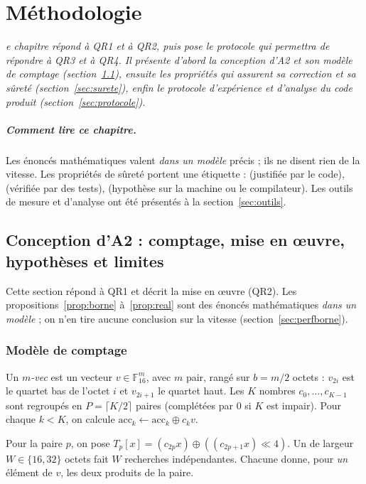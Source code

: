 \let\textcircled=\pgftextcircled
\chapter{Méthodologie}
\label{ch:methodo}

\bigskip

\textit{e chapitre répond à QR1 et à QR2, puis pose le protocole qui permettra de répondre à QR3 et à QR4. Il présente d'abord la conception d'A2 et son modèle de comptage (section~\ref{sec:a2}), ensuite les propriétés qui assurent sa correction et sa sûreté (section~\ref{sec:surete}), enfin le protocole d'expérience et d'analyse du code produit (section~\ref{sec:protocole}).}

\newpage

\paragraph{Comment lire ce chapitre.} Les énoncés mathématiques valent \emph{dans un modèle} précis ; ils ne disent rien de la vitesse. Les propriétés de sûreté portent une étiquette : \Pc{} (justifiée par le code), \Pe{} (vérifiée par des tests), \Hy{} (hypothèse sur la machine ou le compilateur). Les outils de mesure et d'analyse ont été présentés à la section~\ref{sec:outils}.


\section{Conception d'A2 : comptage, mise en œuvre, hypothèses et limites}\label{sec:a2}
Cette section répond à QR1 et décrit la mise en œuvre (QR2). Les propositions~\ref{prop:borne} à~\ref{prop:real} sont des énoncés mathématiques \emph{dans un modèle} ; on n'en tire aucune conclusion sur la vitesse (section~\ref{sec:perfborne}).

\subsection{Modèle de comptage}
\begin{definition}[Données]
Un \emph{$m$-vec} est un vecteur $v\in\mathbb{F}_{16}^m$, avec $m$ pair, rangé sur $b=m/2$ octets : $v_{2i}$ est le quartet bas de l'octet $i$ et $v_{2i+1}$ le quartet haut. Les $K$ nombres $c_0,\dots,c_{K-1}$ sont regroupés en $P=\lceil K/2\rceil$ paires (complétées par 0 si $K$ est impair). Pour chaque $k<K$, on calcule $\mathrm{acc}_k\leftarrow\mathrm{acc}_k\oplus c_k v$.
\end{definition}
Pour la paire $p$, on pose $T_p[x]=(c_{2p}x)\oplus((c_{2p+1}x)\ll4)$. Un \vpshufb{} de largeur $W\in\{16,32\}$ octets fait $W$ recherches indépendantes. Chacune donne, pour \emph{un} élément de $v$, les deux produits de la paire.

